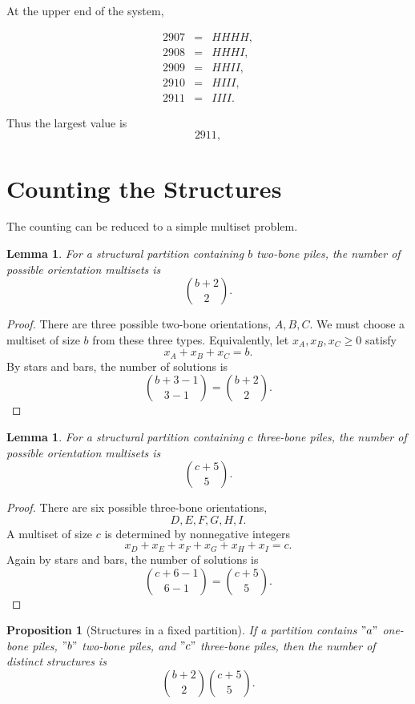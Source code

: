\documentclass[11pt]{article}
\newtheorem{proposition}[definition]{Proposition}
\newtheorem{lemma}[definition]{Lemma}
\theoremstyle{remark}
\begin{document}
At the upper end of the system,

\[
\begin{array}{rcl}
2907&=&HHHH,\\
2908&=&HHHI,\\
2909&=&HHII,\\
2910&=&HIII,\\
2911&=&IIII.
\end{array}
\]

\bigskip
Thus the largest value is
\[
\boxed{2911},
\]

\newpage
\section{Counting the Structures}

The counting can be reduced to a simple multiset problem.

\begin{lemma}
For a structural partition containing \(b\) two-bone piles, the number of possible
orientation multisets is
\[
\binom{b+2}{2}.
\]
\end{lemma}

\begin{proof}
There are three possible two-bone orientations, \(A,B,C\). We must choose a
multiset of size \(b\) from these three types. Equivalently, let
\(x_A,x_B,x_C\geq0\) satisfy
\[
x_A+x_B+x_C=b.
\]
By stars and bars, the number of solutions is
\[
\binom{b+3-1}{3-1}
=
\binom{b+2}{2}.
\]
\end{proof}

\begin{lemma}
For a structural partition containing \(c\) three-bone piles, the number of
possible orientation multisets is
\[
\binom{c+5}{5}.
\]
\end{lemma}

\begin{proof}
There are six possible three-bone orientations,
\[
D,E,F,G,H,I.
\]
A multiset of size \(c\) is determined by nonnegative integers
\[
x_D+x_E+x_F+x_G+x_H+x_I=c.
\]
Again by stars and bars, the number of solutions is
\[
\binom{c+6-1}{6-1}
=
\binom{c+5}{5}.
\]
\end{proof}

\begin{proposition}[Structures in a fixed partition]
If a partition contains \("a"\) one-bone piles, \("b"\) two-bone piles, and
\("c"\) three-bone piles, then the number of distinct structures is
\[
\boxed{
\binom{b+2}{2}\binom{c+5}{5}
}.
\]
\end{proposition}
\end{document}
